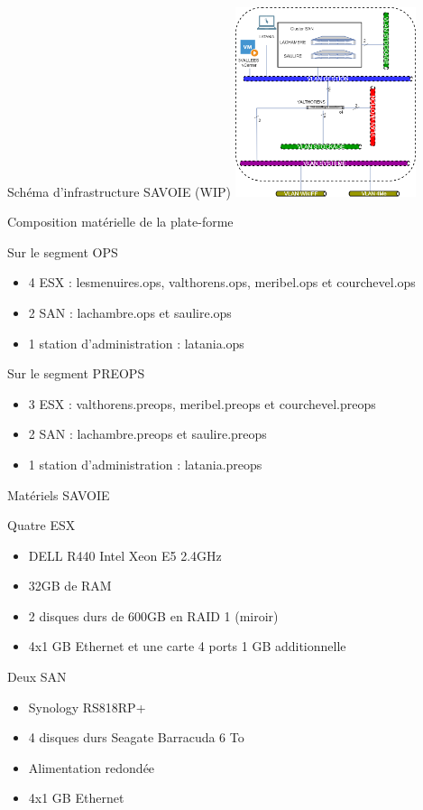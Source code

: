 \documentclass[10pt]{beamer}
\begin{document}
\begin{center}
\begin{frame}{Schéma d'infrastructure SAVOIE (WIP)}
\includegraphics[width=200px]{Schemas/SAVOIE.png}
\end{frame}
\end{center}

\begin{frame}{Composition matérielle de la plate-forme}
\begin{block}{Sur le segment OPS}
\begin{itemize}
\item 4 ESX : lesmenuires.ops, valthorens.ops, meribel.ops et courchevel.ops
\item 2 SAN : lachambre.ops et saulire.ops
\item 1 station d'administration : latania.ops
\end{itemize}
\end{block}\pause
\begin{block}{Sur le segment PREOPS}
\begin{itemize}
\item 3 ESX : valthorens.preops, meribel.preops et courchevel.preops
\item 2 SAN : lachambre.preops et saulire.preops
\item 1 station d'administration : latania.preops
\end{itemize}
\end{block}
\end{frame}

\begin{frame}{Matériels SAVOIE}
\begin{block}{Quatre ESX}
\begin{itemize}
\item DELL R440 Intel Xeon E5 2.4GHz
\item 32GB de RAM 
\item 2 disques durs de 600GB en RAID 1 (miroir)
\item 4x1 GB Ethernet et une carte 4 ports 1 GB additionnelle
\end{itemize}
\end{block}
\begin{block}{Deux SAN}
\begin{itemize}
\item Synology RS818RP+
\item 4 disques durs Seagate Barracuda 6 To
\item Alimentation redondée
\item 4x1 GB Ethernet
\end{itemize}
\end{block}
\end{frame}
\end{document}
